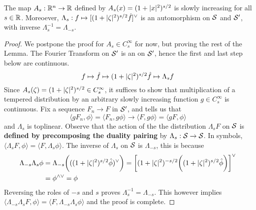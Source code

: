\documentclass[../main-v2-manifolds.tex]{subfiles}
\begin{document}
\begin{lemma}\label{lem:multiplication sobolev factor automorphism}
The map $A_s: {\mathbb{R}^n}\to\mathbb{R}$ defined by $A_s(x) = (1+\vert {x} \vert^2)^{s/2}$ is slowly increasing for all $s\in\mathbb{R}$. Moreoever, $\Lambda_s: f\mapsto [(1+\vert {\zeta} \vert^2)^{s/2}\hat{f}]^{\vee}$ is an automorphism on $\mathcal{S}$ and $\mathcal{S}'$, with inverse $\Lambda_s^{-1} = \Lambda_{-s}$.
\end{lemma}
\begin{proof}
    We postpone the proof for $A_s\in C_s^\infty$ for now, but proving the rest of the Lemma. The Fourier Transform on $\mathcal{S}'$ is an on $\mathcal{S}'$, hence the first and last step below are continuous. 
    \[
    f\mapsto \hat{f}\mapsto (1+\vert {\zeta} \vert^2)^{s/2} \hat{f} \mapsto \Lambda_s f
    \]
    Since $A_s(\zeta) = (1+\vert {\zeta} \vert^2)^{s/2}\in C_s^\infty$, it suffices to show that multiplication of a tempered distribution by an arbitrary slowly increasing function $g\in C_s^\infty$ is continuous. Fix a sequence $F_n\to F$ in $\mathcal{S}'$, and  tells us that
    \[
    \langle g F_n,\phi\rangle = \langle F_n, g\phi\rangle\longrightarrow \langle F,g\phi\rangle = \langle g F,\phi\rangle
    \]
    and $\Lambda_s$ is toplinear. Observe that the action of the the distribution $\Lambda_s F$ on $\mathcal{S}$ is \textbf{defined by precomposing the duality pairing} by $\Lambda_s: \mathcal{S}\to\mathcal{S}$. In symbols, $\langle \Lambda_s F,\phi\rangle = \langle F,\Lambda_s\phi\rangle$. The inverse of $\Lambda_s$ on $\mathcal{S}$ is $\Lambda_{-s}$, this is because
    \begin{align*}
    \Lambda_{-s}\Lambda_s\phi &= \Lambda_{-s}\biggl(((1+\vert {\zeta} \vert^2)^{s/2}\hat{\phi})^{\vee}\biggr)= \biggl[(1+\vert {\zeta} \vert^2)^{-s/2}\biggl((1+\vert {\zeta} \vert^2)^{s/2}\hat{\phi}\biggr)\biggr]^{\vee}\\
    &= \phi^{\wedge\vee}= \phi
    \end{align*}
    Reversing the roles of $-s$ and $s$ proves $\Lambda_s^{-1} = \Lambda_{-s}$. This however implies $\langle\Lambda_{-s}\Lambda_{s}F,\phi\rangle = \langle F,\Lambda_{-s}\Lambda_{s}\phi\rangle$ and the proof is complete.
\end{proof}
\end{document}
